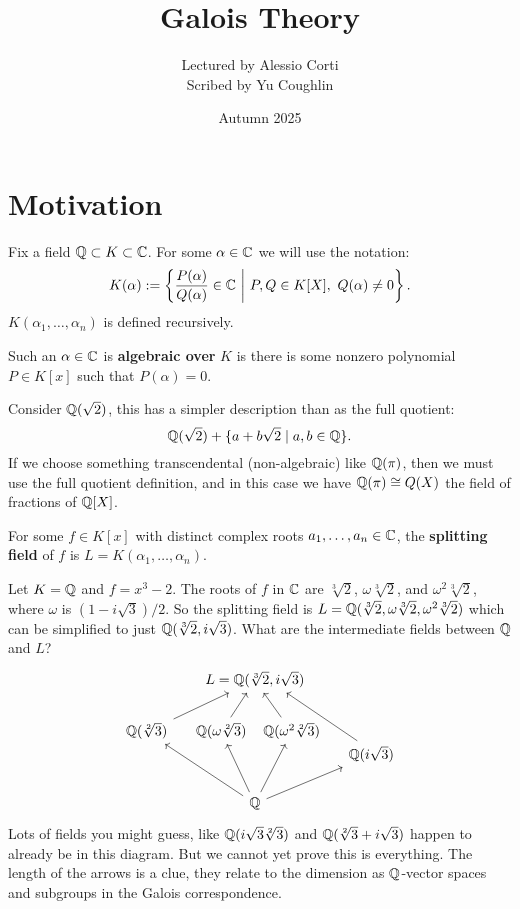 \documentclass{article}
\begin{document}
\title{Galois Theory}
\author{Lectured by Alessio Corti \\
Scribed by Yu Coughlin}
\date{Autumn 2025}

\maketitle

\tableofcontents

\section{Motivation}

Fix a field $\mathbb{Q}\subset K \subset \mathbb{C}$. For some $\alpha\in \mathbb{C}$ we will use the notation: \[
K(\alpha) := \left\{
    \frac{P(\alpha)}{Q(\alpha)} \in \bC \ \middle| \ P,Q\in K[X], \ Q(\alpha)\neq 0
\right\}.
\]
$K(\alpha_1,\ldots,\alpha_n)$ is defined recursively.

\begin{definition}
    Such an $\alpha\in \mathbb{C}$ is \textbf{algebraic over} $K$ is there is some nonzero polynomial $P\in K[x]$ such that $P(\alpha) = 0$.
\end{definition}

Consider $\mathbb{Q}(\sqrt{2})$, this has a simpler description than as the full quotient: \[
\mathbb{Q}(\sqrt{2}) + \{a + b\sqrt{2} \mid a,b\in\mathbb{Q}\}.
\]
If we choose something transcendental (non-algebraic) like $\mathbb{Q}(\pi)$, then we must use the full quotient definition, and in this case we have $\mathbb{Q}(\pi)\cong Q(X)$ the field of fractions of $\mathbb{Q}[X]$.

\begin{definition}
    For some $f\in K[x]$ with distinct complex roots $a_1,\ldots,a_n\in\mathbb{C}$, the \textbf{splitting field} of $f$ is $L=K(\alpha_1,\ldots,\alpha_n)$.
\end{definition}

Let $K=\mathbb{Q}$ and $f=x^3-2$. The roots of $f$ in $\mathbb{C}$ are $\sqrt[3]{2}$, $\omega \sqrt[3]{2}$, and $\omega^2\sqrt[3]{2}$, where $\omega$ is $(1-i\sqrt{3})/2$. So the splitting field is $L=\mathbb{Q}(\sqrt[3]{2},\omega\sqrt[3]{2},\omega^2\sqrt[3]{2})$ which can be simplified to just $\mathbb{Q}(\sqrt[3]{2},i\sqrt{3})$. What are the intermediate fields between $\mathbb{Q}$ and $L$? 
\vspace{-10pt}
\[
\begin{tikzcd}[column sep=small]
& &[-50pt] L = \bQ(\sqrt[3]{2},i\sqrt{3})\\
\bQ(\sqrt[2]{3}) \arrow[urr] 
& \bQ(\omega\sqrt[2]{3}) \arrow[ur] 
& &[-50pt] \bQ(\omega^2\sqrt[2]{3}) \arrow[ul]\\[-20pt]
& & & & \bQ(i\sqrt{3})\arrow[uull, end anchor={[xshift=-4ex]south east}]\\
& & \bQ \arrow[uull] \arrow[uul] \arrow[uur] \arrow[urr]
\end{tikzcd}
\] Lots of fields you might guess, like $\mathbb{Q}(i\sqrt{3}\sqrt[2]{3})$ and $\mathbb{Q}(\sqrt[2]{3} + i\sqrt{3})$ happen to already be in this diagram. But we cannot yet prove this is everything. The length of the arrows is a clue, they relate to the dimension as $\mathbb{Q}$-vector spaces and subgroups in the Galois correspondence.
\end{document}
